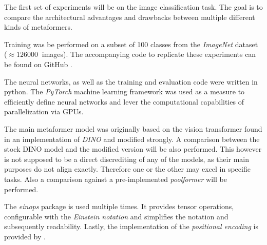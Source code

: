 The first set of experiments will be on the image classification task.
The goal is to compare the architectural advantages and drawbacks between multiple different kinds of metaformers.

Training was be performed on a subset of 100 classes from the \emph{ImageNet} dataset \cite{imagenetDataset} ($\approx \SI{126000}{}$ images).
The accompanying code to replicate these experiments can be found on GitHub \cite{selfComputerScience}.

The neural networks, as well as the training and evaluation code were written in python.
The \emph{PyTorch} \cite{pytorchGithub} machine learning framework was used as a measure to efficiently define neural networks and lever the computational capabilities of parallelization via GPUs.

The main metaformer model was originally based on the vision transformer found in an implementation of \emph{DINO} \cite{dinoGithub} and modified strongly.  
A comparison between the stock DINO model and the modified version will be also performed.
This however is not supposed to be a direct discrediting of any of the models, as their main purposes do not align exactly.
Therefore one or the other may excel in specific tasks.
Also a comparison against a pre-implemented \emph{poolformer} \cite{poolformerGithub} will be performed.

The \emph{einops} package \cite{einopsGithub} is used multiple times.
It provides tensor operations, configurable with the \emph{Einstein notation} and simplifies the notation and subsequently readability.
Lastly, the implementation of the \emph{positional encoding} is provided by \cite{positionalEncodingGithub}.
